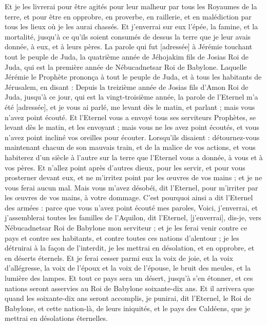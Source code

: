 \begin{multicols}{2}
Et je les livrerai pour être agités pour leur malheur par tous les Royaumes de la terre, et pour être en opprobre, en proverbe, en raillerie, et en malédiction par tous les lieux où je les aurai chassés.
Et j'enverrai sur eux l'épée, la famine, et la mortalité, jusqu’à ce qu'ils soient consumés de dessus la terre que je leur avais donnée, à eux, et à leurs pères.
\VerseOne{}La parole qui fut [adressée] à Jérémie touchant tout le peuple de Juda, la quatrième année de Jéhojakim fils de Josias Roi de Juda, qui est la première année de Nébucadnetsar Roi de Babylone.
Laquelle Jérémie le Prophète prononça à tout le peuple de Juda, et à tous les habitants de Jérusalem, en disant :
Depuis la treizième année de Josias fils d'Amon Roi de Juda, jusqu’à ce jour, qui est la vingt-troisième année, la parole de l'Eternel m'a été [adressée], et je vous ai parlé, me levant dès le matin, et parlant ; mais vous n'avez point écouté.
Et l'Eternel vous a envoyé tous ses serviteurs Prophètes, se levant dès le matin, et les envoyant ; mais vous ne les avez point écoutés, et vous n'avez point incliné vos oreilles pour écouter.
Lorsqu'ils disaient : détournez-vous maintenant chacun de son mauvais train, et de la malice de vos actions, et vous habiterez d'un siècle à l'autre sur la terre que l'Eternel vous a donnée, à vous et à vos pères.
Et n'allez point après d'autres dieux, pour les servir, et pour vous prosterner devant eux, et ne m'irritez point par les œuvres de vos mains ; et je ne vous ferai aucun mal.
Mais vous m'avez désobéi, dit l'Eternel, pour m'irriter par les œuvres de vos mains, à votre dommage.
C'est pourquoi ainsi a dit l'Eternel des armées : parce que vous n'avez point écouté mes paroles,
Voici, j'enverrai, et j'assemblerai toutes les familles de l'Aquilon, dit l'Eternel, [j'enverrai], dis-je, vers Nébucadnetsar Roi de Babylone mon serviteur ; et je les ferai venir contre ce pays et contre ses habitants, et contre toutes ces nations d'alentour ; je les détruirai à la façon de l'interdit, je les mettrai en désolation, et en opprobre, et en déserts éternels.
Et je ferai cesser parmi eux la voix de joie, et la voix d'allégresse, la voix de l'époux et la voix de l'épouse, le bruit des meules, et la lumière des lampes.
Et tout ce pays sera un désert, jusqu’à s'en étonner, et ces nations seront asservies au Roi de Babylone soixante-dix ans.
Et il arrivera que quand les soixante-dix ans seront accomplis, je punirai, dit l'Eternel, le Roi de Babylone, et cette nation-là, de leurs iniquités, et le pays des Caldéens, que je mettrai en désolations éternelles.

\end{multicols}
